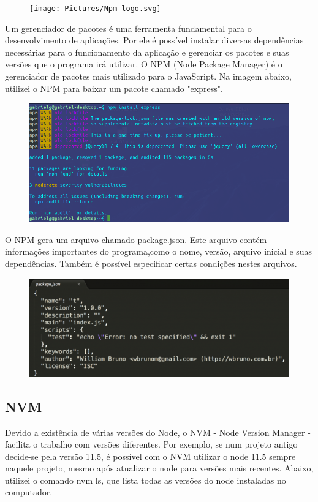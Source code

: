     
    \begin{figure}[H]
    	\centering
    	\texttt{[image: Pictures/Npm-logo.svg]}
    	\caption{}
    	\label{fig:npm-logo}
    \end{figure}

    Um gerenciador de pacotes é uma ferramenta fundamental para o desenvolvimento de aplicações. Por ele é possível instalar diversas dependências necessárias para o funcionamento da aplicação e gerenciar os pacotes e suas versões que o programa irá utilizar. O NPM (Node Package Manager) é o gerenciador de pacotes mais utilizado para o JavaScript. 
    Na imagem abaixo, utilizei o NPM para baixar um pacote chamado "express".
    
    \begin{figure}[H]
    	\centering
    	\includegraphics[width=0.7\linewidth]{Pictures/npm_express}
    	\caption{}
    	\label{fig:npmexpress}
    \end{figure}
	O NPM gera um arquivo chamado package.json. Este arquivo contém informações importantes do programa,como o nome, versão, arquivo inicial e suas dependências. Também é possível especificar certas condições nestes arquivos.
	\begin{figure}[H]
		\centering
		\includegraphics[width=0.7\linewidth]{Pictures/package-json}
		\caption{}
		\label{fig:package-json}
	\end{figure}
	
    
    

    
    \subsection{NVM}
    Devido a existência de várias versões do Node, o NVM - Node Version Manager - facilita o trabalho com versões diferentes. Por exemplo, se num projeto antigo decide-se pela versão 11.5, é possível com o NVM utilizar o node 11.5 sempre naquele projeto, mesmo após atualizar o node para versões mais recentes.
    Abaixo, utilizei o comando nvm ls, que lista todas as versões do node instaladas no computador. 
    
